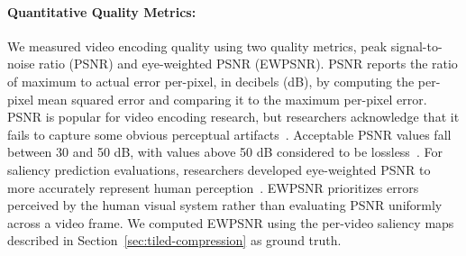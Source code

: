 \paragraph{Quantitative Quality Metrics:}
We measured video encoding quality using two quality metrics, peak signal-to-noise ratio (PSNR) and eye-weighted PSNR (EWPSNR).
PSNR reports the ratio of maximum to actual error per-pixel, in decibels (dB), by computing the per-pixel mean squared error and comparing it to the maximum per-pixel error.
PSNR is popular for video encoding research, but researchers acknowledge that it fails to capture some obvious perceptual artifacts~\cite{netflix2016data}.
Acceptable PSNR values fall between 30 and 50 dB, with values above 50 dB considered to be lossless~\cite{vbench}.
For saliency prediction evaluations, researchers developed eye-weighted PSNR to more accurately represent human perception~\cite{li2011visual}.
EWPSNR prioritizes errors perceived by the human visual system rather than evaluating PSNR uniformly across a video frame.
We computed EWPSNR using the per-video saliency maps described in Section~\ref{sec:tiled-compression} as ground truth.


